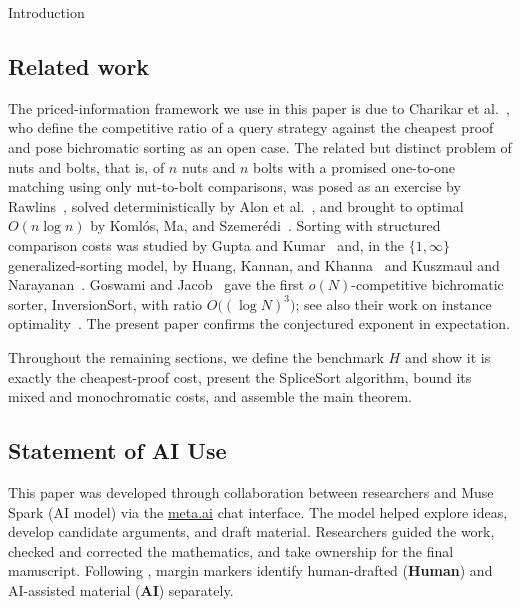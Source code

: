 \documentclass[11pt]{article}
\newcommand{\HumanLabel}{
({\bfseries\sffamily\color{humancolor!70}Human})
}
\newcommand{\AILabel}{
({\bfseries\sffamily\color{aicolor!70}AI})
}
\theoremstyle{definition}
\numberwithin{equation}{section}
\begin{document}
\begin{section}{Introduction}
\begin{humanblock}
\subsection{Related work}
The priced-information framework we use in this paper is due to Charikar et
al.~\cite{charikar2000query}, who define the competitive ratio of a
query strategy against the cheapest proof and pose bichromatic
sorting as an open case.
The related but distinct problem of nuts and bolts, that is, of $n$ nuts and $n$ bolts with a promised one-to-one matching using only nut-to-bolt comparisons, was posed
as an exercise by Rawlins~\cite{rawlins1992compared}, solved
deterministically by Alon et al.~\cite{alon1994matching}, and brought
to optimal $O(n \log n)$ by Koml\'os, Ma, and
Szemer\'edi~\cite{komlos1998matching}.
Sorting with structured comparison costs
was studied by Gupta and Kumar~\cite{gupta2001sorting} and, in the
$\{1,\infty\}$ generalized-sorting model, by Huang, Kannan, and
Khanna~\cite{huang2011algorithms} and Kuszmaul and
Narayanan~\cite{kuszmaul2021stochastic}. Goswami and
Jacob~\cite{goswami2024bichromatic} gave the first $o(N)$-competitive
bichromatic sorter, {\ttfamily InversionSort}, with ratio $O\big((\log N)^3\big)$;
see also their work on instance optimality~\cite{goswami2024instance}.
The present paper confirms the conjectured exponent in expectation.

Throughout the remaining sections, we define the benchmark $H$ and
show it is exactly the cheapest-proof cost, present the
{\ttfamily SpliceSort} algorithm, bound its mixed and monochromatic
costs, and assemble the main theorem.


\section*{Statement of AI Use}
This paper was developed through collaboration between researchers and Muse Spark (AI model) via the \href{http://meta.ai}{meta.ai} chat interface. The model helped explore ideas, develop candidate arguments, and draft material. Researchers guided the work, checked and corrected the mathematics, and take ownership for the final manuscript. Following \cite{schmitt2025extremal}, margin markers identify human-drafted \!\!\HumanLabel and AI-assisted material \!\!\AILabel separately.


\end{humanblock}
\end{section}
\end{document}
